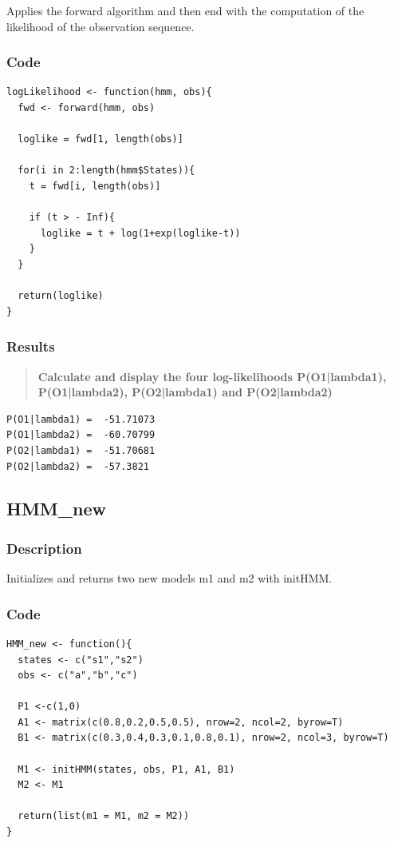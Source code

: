 \documentclass[a4paper]{article}
\begin{document}
Applies the forward algorithm and then end with the computation of the likelihood of the observation sequence.

\subsubsection{Code}

\begin{lstlisting}
logLikelihood <- function(hmm, obs){
  fwd <- forward(hmm, obs)
  
  loglike = fwd[1, length(obs)]
  
  for(i in 2:length(hmm$States)){
    t = fwd[i, length(obs)]
    
    if (t > - Inf){
      loglike = t + log(1+exp(loglike-t))
    }
  }
  
  return(loglike)
}
\end{lstlisting}

\subsubsection{Results}

\begin{quotation}
\textbf{Calculate and display the four log-likelihoods P(O1|lambda1), P(O1|lambda2), P(O2|lambda1) and P(O2|lambda2)}
\end{quotation}

\begin{lstlisting}
P(O1|lambda1) =  -51.71073 
P(O1|lambda2) =  -60.70799 
P(O2|lambda1) =  -51.70681 
P(O2|lambda2) =  -57.3821 
\end{lstlisting}

\subsection{HMM\_new}

\subsubsection{Description}

Initializes and returns two new models m1 and m2 with initHMM.

\subsubsection{Code}

\begin{lstlisting}
HMM_new <- function(){
  states <- c("s1","s2")
  obs <- c("a","b","c")
  
  P1 <-c(1,0)
  A1 <- matrix(c(0.8,0.2,0.5,0.5), nrow=2, ncol=2, byrow=T)
  B1 <- matrix(c(0.3,0.4,0.3,0.1,0.8,0.1), nrow=2, ncol=3, byrow=T)
  
  M1 <- initHMM(states, obs, P1, A1, B1)
  M2 <- M1
  
  return(list(m1 = M1, m2 = M2))
}
\end{lstlisting}
\end{document}
